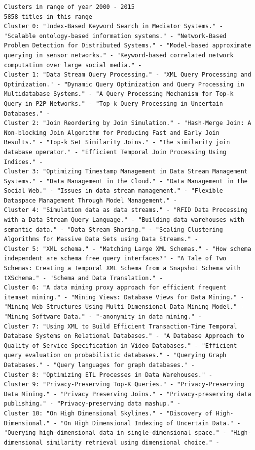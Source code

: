 \documentclass[a4paper,fontsize=11pt]{article}
\begin{document}
\begin{lstlisting}[caption={KMeans output},label={lst:output},breaklines]
Clusters in range of year 2000 - 2015
5858 titles in this range
Cluster 0: "Index-Based Keyword Search in Mediator Systems." - "Scalable ontology-based information systems." - "Network-Based Problem Detection for Distributed Systems." - "Model-based approximate querying in sensor networks." - "Keyword-based correlated network computation over large social media." - 
Cluster 1: "Data Stream Query Processing." - "XML Query Processing and Optimization." - "Dynamic Query Optimization and Query Processing in Multidatabase Systems." - "A Query Processing Mechanism for Top-k Query in P2P Networks." - "Top-k Query Processing in Uncertain Databases." - 
Cluster 2: "Join Reordering by Join Simulation." - "Hash-Merge Join: A Non-blocking Join Algorithm for Producing Fast and Early Join Results." - "Top-k Set Similarity Joins." - "The similarity join database operator." - "Efficient Temporal Join Processing Using Indices." - 
Cluster 3: "Optimizing Timestamp Management in Data Stream Management Systems." - "Data Management in the Cloud." - "Data Management in the Social Web." - "Issues in data stream management." - "Flexible Dataspace Management Through Model Management." - 
Cluster 4: "Simulation data as data streams." - "RFID Data Processing with a Data Stream Query Language." - "Building data warehouses with semantic data." - "Data Stream Sharing." - "Scaling Clustering Algorithms for Massive Data Sets using Data Streams." - 
Cluster 5: "XML schema." - "Matching Large XML Schemas." - "How schema independent are schema free query interfaces?" - "A Tale of Two Schemas: Creating a Temporal XML Schema from a Snapshot Schema with tXSchema." - "Schema and Data Translation." - 
Cluster 6: "A data mining proxy approach for efficient frequent itemset mining." - "Mining Views: Database Views for Data Mining." - "Mining Web Structures Using Multi-Dimensional Data Mining Model." - "Mining Software Data." - "-anonymity in data mining." - 
Cluster 7: "Using XML to Build Efficient Transaction-Time Temporal Database Systems on Relational Databases." - "A Database Approach to Quality of Service Specification in Video Databases." - "Efficient query evaluation on probabilistic databases." - "Querying Graph Databases." - "Query languages for graph databases." - 
Cluster 8: "Optimizing ETL Processes in Data Warehouses." - 
Cluster 9: "Privacy-Preserving Top-K Queries." - "Privacy-Preserving Data Mining." - "Privacy Preserving Joins." - "Privacy-preserving data publishing." - "Privacy-preserving data mashup." - 
Cluster 10: "On High Dimensional Skylines." - "Discovery of High-Dimensional." - "On High Dimensional Indexing of Uncertain Data." - "Querying high-dimensional data in single-dimensional space." - "High-dimensional similarity retrieval using dimensional choice." - 

\end{lstlisting}
\end{document}
